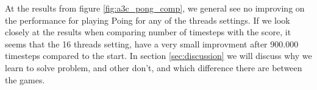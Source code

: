 \documentclass[11pt]{article}
\begin{document}
At the results from figure \ref{fig:a3c_pong_comp}, we general see no improving on
the performance for playing Poing for any of the threads settings. If
we look closely at the results when comparing number of timesteps with
the score, it seems that the 16 threads setting, have a very small
improvment after 900.000 timesteps compared to the start. In section \ref{sec:discussion}
we will discuss why we learn to solve problem, and other don't, and
which difference there are between the games.
\end{document}

